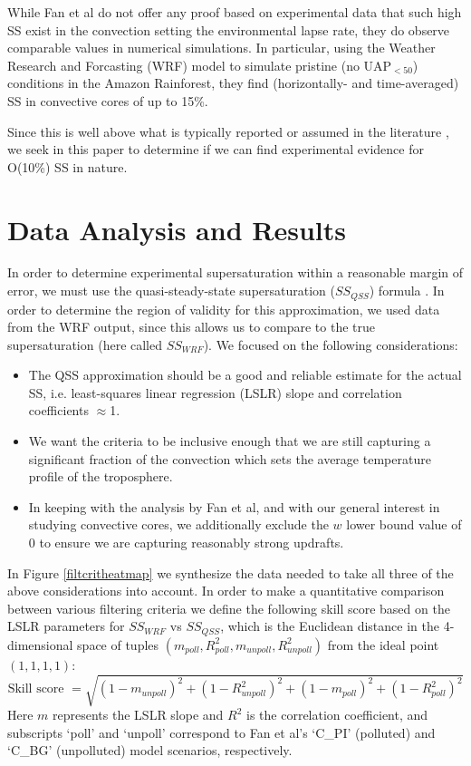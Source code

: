 \documentclass{article}
\begin{document}
While Fan et al do not offer any proof based on experimental data that such high SS exist in the convection setting the environmental lapse rate, they do observe comparable values in numerical simulations. In particular, using the Weather Research and Forcasting (WRF) model to simulate pristine (no UAP$_{<50}$) conditions in the Amazon Rainforest, they find (horizontally- and time-averaged) SS in convective cores of up to 15\%.

Since this is well above what is typically reported or assumed in the literature \cite{Hoppel1996, Yang2019, Koike2012, Politovich1988, Moteki2019, Siebert2017, Shen2018, Hammer2014, Li2019}, we seek in this paper to determine if we can find experimental evidence for O(10\%) SS in nature.

\section{Data Analysis and Results}

In order to determine experimental supersaturation within a reasonable margin of error, we must use the quasi-steady-state supersaturation ($SS_{QSS}$) formula \cite{Rogers1989}. In order to determine the region of validity for this approximation, we used data from the WRF output, since this allows us to compare to the true supersaturation (here called $SS_{WRF}$). We focused on the following considerations:
\begin{itemize}
\item The QSS approximation should be a good and reliable estimate for the actual SS, i.e. least-squares linear regression (LSLR) slope and correlation coefficients $\approx$1.  
\item We want the criteria to be inclusive enough that we are still capturing a significant fraction of the convection which sets the average temperature profile of the troposphere.
\item In keeping with the analysis by Fan et al, and with our general interest in studying convective cores, we additionally exclude the $w$ lower bound value of 0 to ensure we are capturing reasonably strong updrafts. 
\end{itemize}
In Figure \ref{filtcritheatmap} we synthesize the data needed to take all three of the above considerations into account. In order to make a quantitative comparison between various filtering criteria we define the following skill score based on the LSLR parameters for $SS_{WRF}$ vs $SS_{QSS}$, which is the Euclidean distance in the 4-dimensional space of tuples $(m_{poll}, R^2_{poll}, m_{unpoll}, R^2_{unpoll})$ from the ideal point $(1, 1, 1, 1)$:
\begin{equation}
\label{skillscore}
\text{Skill score } = \sqrt{(1-m_{unpoll})^2 + (1-R_{unpoll}^2)^2 + (1-m_{poll})^2 + (1-R_{poll}^2)^2}
\end{equation}
Here $m$ represents the LSLR slope and $R^2$ is the correlation coefficient, and subscripts `poll' and `unpoll' correspond to Fan et al's `C\_PI' (polluted) and `C\_BG' (unpolluted) model scenarios, respectively.
\end{document}
